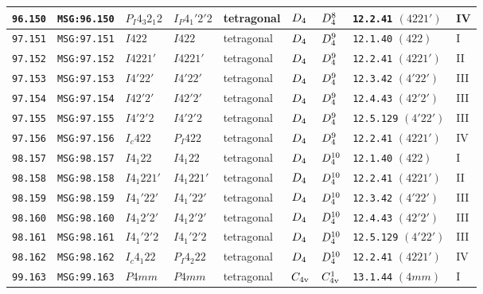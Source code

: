 \documentclass[fleqn,10pt]{jsarticle}
\begin{document}
\begin{center}
\begin{longtable}{lllllllll}
\texttt{96.150} & \texttt{MSG:96.150} & $P_{I}4_{3}2_{1}2$ & $I_{P}4_{1}'2'2$ & tetragonal & $D_{\rm 4}$ & $D_{\rm 4}^{8}$ & \texttt{12.2.41} $(4221')$ & IV \\ \hline
\texttt{97.151} & \texttt{MSG:97.151} & $I422$ & $I422$ & tetragonal & $D_{\rm 4}$ & $D_{\rm 4}^{9}$ & \texttt{12.1.40} $(422)$ & I \\
\texttt{97.152} & \texttt{MSG:97.152} & $I4221'$ & $I4221'$ & tetragonal & $D_{\rm 4}$ & $D_{\rm 4}^{9}$ & \texttt{12.2.41} $(4221')$ & II \\
\texttt{97.153} & \texttt{MSG:97.153} & $I4'22'$ & $I4'22'$ & tetragonal & $D_{\rm 4}$ & $D_{\rm 4}^{9}$ & \texttt{12.3.42} $(4'22')$ & III \\
\texttt{97.154} & \texttt{MSG:97.154} & $I42'2'$ & $I42'2'$ & tetragonal & $D_{\rm 4}$ & $D_{\rm 4}^{9}$ & \texttt{12.4.43} $(42'2')$ & III \\
\texttt{97.155} & \texttt{MSG:97.155} & $I4'2'2$ & $I4'2'2$ & tetragonal & $D_{\rm 4}$ & $D_{\rm 4}^{9}$ & \texttt{12.5.129} $(4'22')$ & III \\
\texttt{97.156} & \texttt{MSG:97.156} & $I_{c}422$ & $P_{I}422$ & tetragonal & $D_{\rm 4}$ & $D_{\rm 4}^{9}$ & \texttt{12.2.41} $(4221')$ & IV \\ \hline
\texttt{98.157} & \texttt{MSG:98.157} & $I4_{1}22$ & $I4_{1}22$ & tetragonal & $D_{\rm 4}$ & $D_{\rm 4}^{10}$ & \texttt{12.1.40} $(422)$ & I \\
\texttt{98.158} & \texttt{MSG:98.158} & $I4_{1}221'$ & $I4_{1}221'$ & tetragonal & $D_{\rm 4}$ & $D_{\rm 4}^{10}$ & \texttt{12.2.41} $(4221')$ & II \\
\texttt{98.159} & \texttt{MSG:98.159} & $I4_{1}'22'$ & $I4_{1}'22'$ & tetragonal & $D_{\rm 4}$ & $D_{\rm 4}^{10}$ & \texttt{12.3.42} $(4'22')$ & III \\
\texttt{98.160} & \texttt{MSG:98.160} & $I4_{1}2'2'$ & $I4_{1}2'2'$ & tetragonal & $D_{\rm 4}$ & $D_{\rm 4}^{10}$ & \texttt{12.4.43} $(42'2')$ & III \\
\texttt{98.161} & \texttt{MSG:98.161} & $I4_{1}'2'2$ & $I4_{1}'2'2$ & tetragonal & $D_{\rm 4}$ & $D_{\rm 4}^{10}$ & \texttt{12.5.129} $(4'22')$ & III \\
\texttt{98.162} & \texttt{MSG:98.162} & $I_{c}4_{1}22$ & $P_{I}4_{2}22$ & tetragonal & $D_{\rm 4}$ & $D_{\rm 4}^{10}$ & \texttt{12.2.41} $(4221')$ & IV \\ \hline
\texttt{99.163} & \texttt{MSG:99.163} & $P4mm$ & $P4mm$ & tetragonal & $C_{\rm 4v}$ & $C_{\rm 4v}^{1}$ & \texttt{13.1.44} $(4mm)$ & I \\

\end{longtable}
\end{center}
\end{document}
